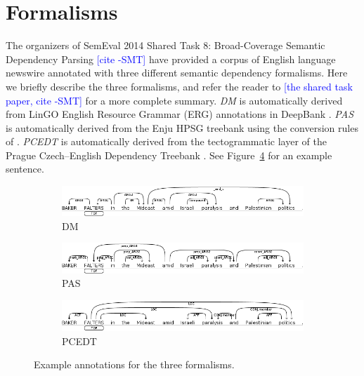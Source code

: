 \documentclass[11pt]{article}
\newcommand{\sam}[1]{\textcolor{blue}{[#1 -SMT]}}
\begin{document}
\section{Formalisms} \label{s:formalisms}

The organizers of SemEval 2014 Shared Task 8: Broad-Coverage Semantic Dependency
Parsing \sam{cite} have provided a corpus of English language newswire
annotated with three different semantic dependency formalisms.
Here we briefly describe the three formalisms, and refer the reader to \sam{the
shared task paper, cite} for a more complete summary.
\emph{DM} is automatically derived from LinGO English Resource Grammar (ERG)
annotations in DeepBank \cite{flickinger_deepbank_2012}.
\emph{PAS} is automatically derived from the Enju HPSG treebank using the
conversion rules of .
\emph{PCEDT} is automatically derived from the tectogrammatic layer of the
Prague Czech--English Dependency Treebank \cite{hajic_building_1998}.
See Figure~\ref{fig:formalisms} for an example sentence.
\begin{figure}
	\centering
	\begin{subfigure}{0.7\textwidth}
		\includegraphics[width=\textwidth]{fig/example_dm}
		\caption{DM}
		\label{fig:dm}
	\end{subfigure}
	\begin{subfigure}{0.7\textwidth}
		\includegraphics[width=\textwidth]{fig/example_pas}
		\caption{PAS}
		\label{fig:pas}
	\end{subfigure}
	\begin{subfigure}{0.7\textwidth}
		\includegraphics[width=\textwidth]{fig/example_pcedt}
		\caption{PCEDT}
		\label{fig:pcedt}
	\end{subfigure}
	\caption{Example annotations for the three formalisms.}
	\label{fig:formalisms}
\end{figure}
\end{document}
